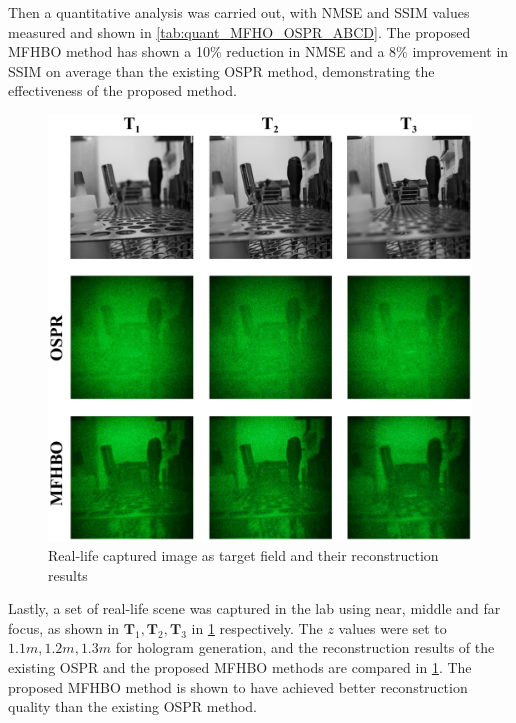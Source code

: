 	Then a quantitative analysis was carried out, with NMSE and SSIM values measured and shown in \cref{tab:quant_MFHO_OSPR_ABCD}. The proposed MFHBO method has shown a 10\% reduction in NMSE and a 8\% improvement in SSIM on average than the existing OSPR method, demonstrating the effectiveness of the proposed method.


	\begin{figure}[H]
		\centering
		\includegraphics[width=1.0\textwidth]{MFHO_OSPR_Pen_holder.pdf}
		\caption{Real-life captured image as target field and their reconstruction results}
		\label{fig:MFHO_OSPR_Pen_holder}
	\end{figure}

	Lastly, a set of real-life scene was captured in the lab using near, middle and far focus, as shown in $\textbf{T}_1, \textbf{T}_2, \textbf{T}_3$ in \cref{fig:MFHO_OSPR_Pen_holder} respectively. The $z$ values were set to $1.1m, 1.2m, 1.3 m$ for hologram generation, and the reconstruction results of the existing OSPR and the proposed MFHBO methods are compared in \cref{fig:MFHO_OSPR_Pen_holder}. The proposed MFHBO method is shown to have achieved better reconstruction quality than the existing OSPR method.

